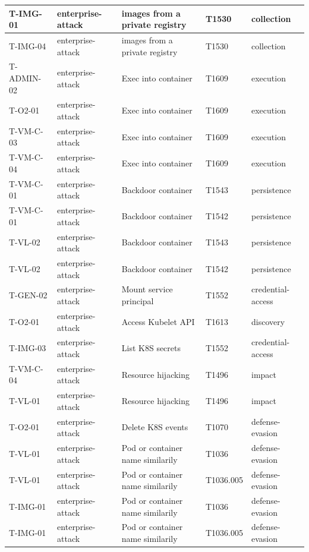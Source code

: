 \begin{longtable}{|l|l|l|l|l|}
    T-IMG-01 & enterprise-attack & images from a private registry & T1530 & collection \\ \hline
    T-IMG-04 & enterprise-attack & images from a private registry & T1530 & collection \\ \hline
    T-ADMIN-02 & enterprise-attack & Exec into container & T1609 & execution \\ \hline
    T-O2-01 & enterprise-attack & Exec into container & T1609 & execution \\ \hline
    T-VM-C-03 & enterprise-attack & Exec into container & T1609 & execution \\ \hline
    T-VM-C-04 & enterprise-attack & Exec into container & T1609 & execution \\ \hline
    T-VM-C-01 & enterprise-attack & Backdoor container & T1543 & persistence \\ \hline
    T-VM-C-01 & enterprise-attack & Backdoor container & T1542 & persistence \\ \hline
    T-VL-02 & enterprise-attack & Backdoor container & T1543 & persistence \\ \hline
    T-VL-02 & enterprise-attack & Backdoor container & T1542 & persistence \\ \hline
    T-GEN-02 & enterprise-attack & Mount service principal & T1552 & credential-access \\ \hline
    T-O2-01 & enterprise-attack & Access Kubelet API & T1613 & discovery \\ \hline
    T-IMG-03 & enterprise-attack & List K8S secrets & T1552 & credential-access \\ \hline
    T-VM-C-04 & enterprise-attack & Resource hijacking & T1496 & impact \\ \hline
    T-VL-01 & enterprise-attack & Resource hijacking & T1496 & impact \\ \hline
    T-O2-01 & enterprise-attack & Delete K8S events & T1070 & defense-evasion \\ \hline
    T-VL-01 & enterprise-attack & Pod or container name similarily & T1036 & defense-evasion \\ \hline
    T-VL-01 & enterprise-attack & Pod or container name similarily & T1036.005 & defense-evasion \\ \hline
    T-IMG-01 & enterprise-attack & Pod or container name similarily & T1036 & defense-evasion \\ \hline
    T-IMG-01 & enterprise-attack & Pod or container name similarily & T1036.005 & defense-evasion \\ \hline

\end{longtable}
